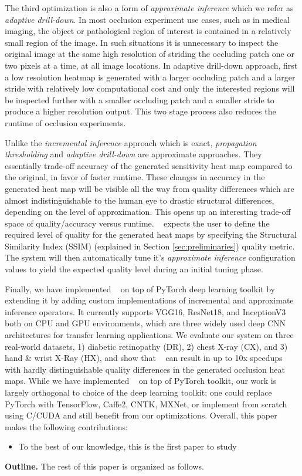 The third optimization is also a form of \textit{approximate inference} which we refer as \textit{adaptive drill-down}.
In most occlusion experiment use cases, such as in medical imaging, the object or pathological region of interest is contained in a relatively small region of the image.
In such situations it is unnecessary to inspect the original image at the same high resolution of striding the occluding patch one or two pixels at a time, at all image locations.
In adaptive drill-down approach, first a low resolution heatmap is generated with a larger occluding patch and a larger stride with relatively low computational cost and only the interested regions will be inspected further with a smaller occluding patch and a smaller stride to produce a higher resolution output.
This two stage process also reduces the runtime of occlusion experiments.

Unlike the \textit{incremental inference} approach which is exact, \textit{propagation thresholding} and \textit{adaptive drill-down} are approximate approaches. They essentially trade-off accuracy of the generated sensitivity heat map compared to the original, in favor of faster runtime.
These changes in accuracy in the generated heat map will be visible all the way from quality differences which are almost indistinguishable to the human eye to drastic structural differences, depending on the level of approximation.
This opens up an interesting trade-off space of quality/accuracy versus runtime. \system~ expects the user to define the required level of quality for the generated heat maps by specifying the Structural Similarity Index (SSIM) (explained in Section \ref{sec:preliminaries}) quality metric.
The system will then automatically tune it's \textit{approximate inference} configuration values to yield the expected quality level during an initial tuning phase.

Finally, we have implemented \system~ on top of PyTorch deep learning toolkit by extending it by adding custom implementations of incremental and approximate inference operators.
It currently supports VGG16, ResNet18, and InceptionV3 both on CPU and GPU environments, which are three widely used deep CNN architectures for transfer learning applications.
We evaluate our system on three real-world datasets, 1) diabetic retinopathy (DR), 2) chest X-ray (CX), and 3) hand \& wrist X-Ray (HX), and show that \system~ can result in up to 10x speedups with hardly distinguishable quality differences in the generated occlusion heat maps. While we have implemented \system~ on top of PyTorch toolkit, our work is largely orthogonal to choice of the deep learning toolkit; one could replace PyTorch with TensorFlow, Caffe2, CNTK, MXNet, or implement from scratch using C/CUDA and still benefit from our optimizations.
Overall, this paper makes the following contributions:

\begin{itemize}
	\item To the best of our knowledge, this is the first paper to study
\end{itemize}

\vspace{2mm}
\noindent \textbf{Outline.} The rest of this paper is organized as follows.
